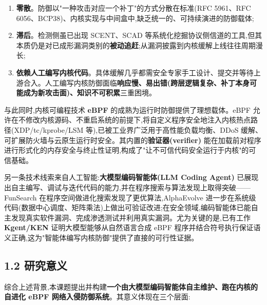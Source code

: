 \begin{enumerate}[leftmargin=2em,itemsep=1pt,topsep=2pt]
  \item \textbf{零散}。防御以"一种攻击对应一个补丁"的方式分散在标准(RFC 5961\supercite{rfc5961}、RFC 6056\supercite{rfc6056}、BCP38\supercite{rfc2827})、内核实现与中间盒中,缺乏统一的、可持续演进的防御载体;
  \item \textbf{滞后}。检测侧虽已出现 SCENT\supercite{cao2019scent}、SCAD\supercite{man2024scad} 等系统化挖掘协议侧信道的工具,但其本质仍是对已成形漏洞类别的\textbf{被动追赶};从漏洞披露到内核缓解上线往往周期漫长;
  \item \textbf{依赖人工编写内核代码}。具体缓解几乎都需安全专家手工设计、提交并等待上游合入。人工编写内核防御面临\textbf{响应慢、易出错(跨层逻辑复杂、补丁本身可能成为新攻击面)、知识不可积累}三重困境。
\end{enumerate}
与此同时,内核可编程技术 \textbf{eBPF} 的成熟为运行时防御提供了理想载体。eBPF 允许在不修改内核源码、不重启系统的前提下,将自定义程序安全地注入内核热点路径(XDP/tc/kprobe/LSM 等),已被工业界广泛用于高性能负载均衡\supercite{shirokov2018katran}、DDoS 缓解\supercite{fabre2018l4drop}、可扩展防火墙\supercite{miano2019bpfiptables}与云原生运行时安全\supercite{graf2020cilium,tetragon2022,falco2018}。其内置的\textbf{验证器(verifier)} 能在加载前对程序进行形式化的内存安全与终止性证明\supercite{gershuni2019prevail,sun2024stateembedding},构成了"让不可信代码安全运行于内核"的可信基础。

另一条技术线索来自人工智能:\textbf{大模型编码智能体(LLM Coding Agent)} 已展现出自主编写、调试与迭代代码的能力,并在程序搜索与算法发现上取得突破——FunSearch 在程序空间做进化搜索发现了更优算法\supercite{romeraparedes2024funsearch},AlphaEvolve 进一步在系统级代码(数据中心调度、矩阵乘法)上做出可验证改进\supercite{novikov2025alphaevolve};在安全领域,编码智能体已能自主发现真实软件漏洞\supercite{glazunov2024naptime}、完成渗透测试\supercite{deng2024pentestgpt}并利用真实漏洞\supercite{fang2024oneday}。尤为关键的是,已有工作 \textbf{Kgent/KEN} 证明大模型能够从自然语言合成 eBPF 程序并结合符号执行保证语义正确\supercite{yang2024kgent},这为"智能体编写内核防御"提供了直接的可行性证据。

\subsection*{1.2 研究意义}
综合上述背景,本课题提出并构建\textbf{一个由大模型编码智能体自主维护、跑在内核的自进化 eBPF 网络入侵防御系统}。其意义体现在三个层面:

